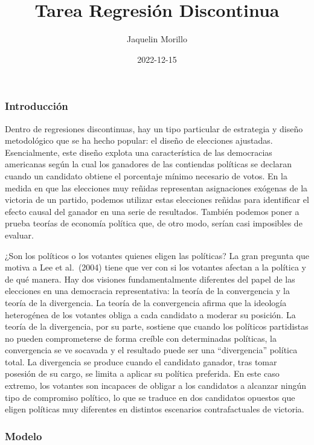 \documentclass[
]{article}
\title{Tarea Regresión Discontinua}
\author{Jaquelin Morillo}
\date{2022-12-15}
\begin{document}
\maketitle

\hypertarget{introducciuxf3n}{%
\subsubsection{Introducción}\label{introducciuxf3n}}

Dentro de regresiones discontinuas, hay un tipo particular de estrategia
y diseño metodológico que se ha hecho popular: el diseño de elecciones
ajustadas. Esencialmente, este diseño explota una característica de las
democracias americanas según la cual los ganadores de las contiendas
políticas se declaran cuando un candidato obtiene el porcentaje mínimo
necesario de votos. En la medida en que las elecciones muy reñidas
representan asignaciones exógenas de la victoria de un partido, podemos
utilizar estas elecciones reñidas para identificar el efecto causal del
ganador en una serie de resultados. También podemos poner a prueba
teorías de economía política que, de otro modo, serían casi imposibles
de evaluar.

¿Son los políticos o los votantes quienes eligen las políticas? La gran
pregunta que motiva a Lee et al.~(2004) tiene que ver con si los
votantes afectan a la política y de qué manera. Hay dos visiones
fundamentalmente diferentes del papel de las elecciones en una
democracia representativa: la teoría de la convergencia y la teoría de
la divergencia. La teoría de la convergencia afirma que la ideología
heterogénea de los votantes obliga a cada candidato a moderar su
posición. La teoría de la divergencia, por su parte, sostiene que cuando
los políticos partidistas no pueden comprometerse de forma creíble con
determinadas políticas, la convergencia se ve socavada y el resultado
puede ser una ``divergencia'' política total. La divergencia se produce
cuando el candidato ganador, tras tomar posesión de su cargo, se limita
a aplicar su política preferida. En este caso extremo, los votantes son
incapaces de obligar a los candidatos a alcanzar ningún tipo de
compromiso político, lo que se traduce en dos candidatos opuestos que
eligen políticas muy diferentes en distintos escenarios contrafactuales
de victoria.

\hypertarget{modelo}{%
\subsubsection{Modelo}\label{modelo}}
\end{document}
